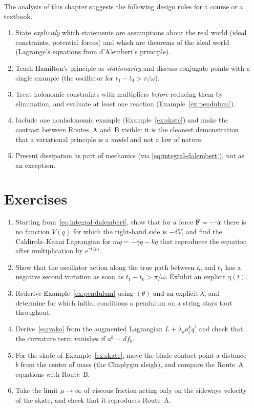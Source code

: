 The analysis of this chapter suggests the following design rules for a course
or a textbook.
\begin{enumerate}
  \item State \emph{explicitly} which statements are assumptions about the
  real world (ideal constraints, potential forces) and which are theorems of
  the ideal world (Lagrange's equations from d'Alembert's principle).
  \item Teach Hamilton's principle as \emph{stationarity} and discuss
  conjugate points with a single example (the oscillator for
  $t_1-t_0>\pi/\omega$).
  \item Treat holonomic constraints with multipliers \emph{before} reducing
  them by elimination, and evaluate at least one reaction (Example~\ref{ex:pendulum}).
  \item Include one nonholonomic example (Example~\ref{ex:skate}) and make
  the contrast between Routes~A and~B visible: it is the cleanest
  demonstration that a variational principle is a \emph{model} and not a
  law of nature.
  \item Present dissipation as part of mechanics (via
  \eqref{eq:integral-dalembert}), not as an exception.
\end{enumerate}

\section*{Exercises}

\begin{enumerate}
  \item Starting from~\eqref{eq:integral-dalembert}, show that for a force
  $\mathbf F=-\gamma\dot{\mathbf r}$ there is no function $V(q)$ for which the
  right-hand side is $-\delta V$, and find the Caldirola--Kanai Lagrangian
  for $m\ddot q=-\gamma\dot q-kq$ that reproduces the equation after
  multiplication by $e^{\gamma t/m}$.
  \item Show that the oscillator action along the true path between $t_0$ and
  $t_1$ has a negative second variation as soon as $t_1-t_0>\pi/\omega$.
  Exhibit an explicit $\eta(t)$.
  \item Rederive Example~\ref{ex:pendulum} using $(\theta)$ and an explicit
  $\lambda$, and determine for which initial conditions a pendulum on a
  string stays taut throughout.
  \item Derive~\eqref{eq:vako} from the augmented Lagrangian
  $L+\lambda_ka^k_i\dot q^i$ and check that the curvature term vanishes if
  $a^k=df_k$.
  \item For the skate of Example~\ref{ex:skate}, move the blade contact point a
  distance $b$ from the center of mass (the Chaplygin sleigh), and compare the
  Route~A equations with Route~B.
  \item Take the limit $\mu\to\infty$ of viscous friction acting only on the
  sideways velocity of the skate, and check that it reproduces Route~A.
\end{enumerate}

